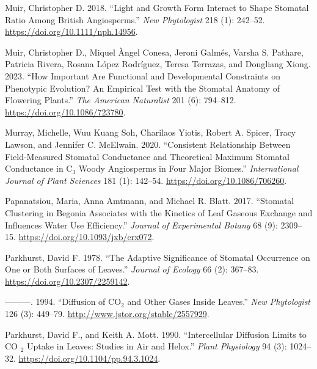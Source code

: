 \documentclass[12pt,halfline,a4paper,]{ouparticle}
\newlength{\cslhangindent}
\newlength{\cslentryspacingunit} %
\newenvironment{CSLReferences}[2] %
 {%
  \setlength{\parindent}{0pt}
  \ifodd #1
  \let\oldpar\par
  \def\par{\hangindent=\cslhangindent\oldpar}
  \fi
  \setlength{\parskip}{#2\cslentryspacingunit}
 }%
 {}
\begin{document}
\begin{CSLReferences}{1}{0}
\leavevmode{}%
Muir, Christopher D. 2018. {``Light and Growth Form Interact to Shape
Stomatal Ratio Among {British} Angiosperms.''} \emph{New Phytologist}
218 (1): 242--52. \url{https://doi.org/10.1111/nph.14956}.

\leavevmode{}%
Muir, Christopher D., Miquel Àngel Conesa, Jeroni Galmés, Varsha S.
Pathare, Patricia Rivera, Rosana López Rodríguez, Teresa Terrazas, and
Dongliang Xiong. 2023. {``How Important Are Functional and Developmental
Constraints on Phenotypic Evolution? {An} Empirical Test with the
Stomatal Anatomy of Flowering Plants.''} \emph{The American Naturalist}
201 (6): 794--812. \url{https://doi.org/10.1086/723780}.

\leavevmode{}%
Murray, Michelle, Wuu Kuang Soh, Charilaos Yiotis, Robert A. Spicer,
Tracy Lawson, and Jennifer C. McElwain. 2020. {``Consistent Relationship
Between Field-Measured Stomatal Conductance and Theoretical Maximum
Stomatal Conductance in {C}\(_{\textrm{3}}\) Woody Angiosperms in Four
Major Biomes.''} \emph{International Journal of Plant Sciences} 181 (1):
142--54. \url{https://doi.org/10.1086/706260}.

\leavevmode{}%
Papanatsiou, Maria, Anna Amtmann, and Michael R. Blatt. 2017.
{``Stomatal Clustering in {Begonia} Associates with the Kinetics of Leaf
Gaseous Exchange and Influences Water Use Efficiency.''} \emph{Journal
of Experimental Botany} 68 (9): 2309--15.
\url{https://doi.org/10.1093/jxb/erx072}.

\leavevmode{}%
Parkhurst, David F. 1978. {``The {Adaptive} {Significance} of {Stomatal}
{Occurrence} on {One} or {Both} {Surfaces} of {Leaves}.''} \emph{Journal
of Ecology} 66 (2): 367--83. \url{https://doi.org/10.2307/2259142}.

\leavevmode{}%
---------. 1994. {``Diffusion of {CO}\(_{\textrm{2}}\) and Other Gases
Inside Leaves.''} \emph{New Phytologist} 126 (3): 449--79.
\url{http://www.jstor.org/stable/2557929}.

\leavevmode{}%
Parkhurst, David F., and Keith A. Mott. 1990. {``Intercellular
{Diffusion} {Limits} to {CO} \(_{\textrm{2}}\) {Uptake} in {Leaves}:
{Studies} in {Air} and {Helox}.''} \emph{Plant Physiology} 94 (3):
1024--32. \url{https://doi.org/10.1104/pp.94.3.1024}.


\end{CSLReferences}
\end{document}
